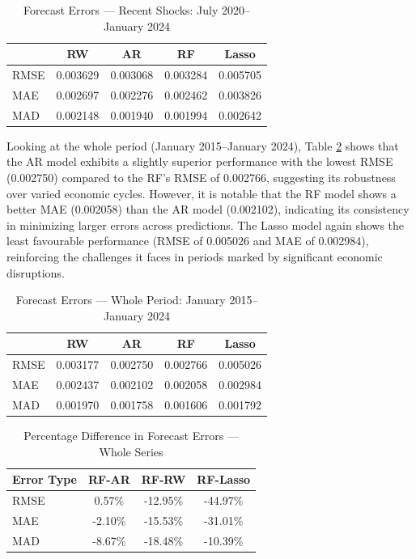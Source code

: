 \begin{table}[H]
\centering
\caption{Forecast Errors — Recent Shocks: July 2020–January 2024} \label{tab:errors_post}
\begin{tabular}{lcccc}
\toprule
& RW & AR & RF & Lasso \\
\midrule
RMSE & 0.003629 & 0.003068 & 0.003284 & 0.005705 \\
MAE  & 0.002697 & 0.002276 & 0.002462 & 0.003826 \\
MAD  & 0.002148 & 0.001940 & 0.001994 & 0.002642 \\
\bottomrule
\end{tabular}
\end{table}



Looking at the whole period (January 2015–January 2024), Table \ref{tab:errors_whole} shows that the AR model exhibits a slightly superior performance with the lowest RMSE (0.002750) compared to the RF's RMSE of 0.002766, suggesting its robustness over varied economic cycles. However, it is notable that the RF model shows a better MAE (0.002058) than the AR model (0.002102), indicating its consistency in minimizing larger errors across predictions. The Lasso model again shows the least favourable performance (RMSE of 0.005026 and MAE of 0.002984), reinforcing the challenges it faces in periods marked by significant economic disruptions.


\begin{table}[H]
\centering
\caption{Forecast Errors — Whole Period: January 2015–January 2024} \label{tab:errors_whole}
\begin{tabular}{lcccc}
\toprule
& RW & AR & RF & Lasso \\
\midrule
RMSE & 0.003177 & 0.002750 & 0.002766 & 0.005026 \\
MAE  & 0.002437 & 0.002102 & 0.002058 & 0.002984 \\
MAD  & 0.001970 & 0.001758 & 0.001606 & 0.001792 \\
\bottomrule
\end{tabular}
\end{table}


\begin{table}[H]
\centering
\caption{Percentage Difference in Forecast Errors — Whole Series} \label{tab:diff_whole}
\begin{tabular}{lccc}
\toprule
Error Type & RF-AR & RF-RW & RF-Lasso \\
\midrule
RMSE & 0.57\% & -12.95\% & -44.97\% \\
MAE  & -2.10\% & -15.53\% & -31.01\% \\
MAD  & -8.67\% & -18.48\% & -10.39\% \\
\bottomrule
\end{tabular}
\end{table}



